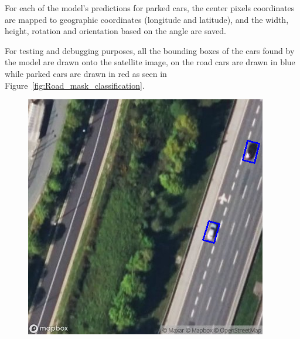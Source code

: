 For each of the model's predictions for parked cars, the center pixels coordinates are mapped to geographic coordinates (longitude and latitude), and the width, height, rotation and orientation based on the angle are saved.

For testing and debugging purposes, all the bounding boxes of the cars found by the model are drawn onto the satellite image, on the road cars are drawn in blue while parked cars are drawn in red as seen in Figure~\ref{fig:Road_mask_classification}.

\begin{figure}[htbp]
    \centering
    \begin{minipage}{0.45\textwidth}
        \centering
        \includegraphics[width=\textwidth]{images/road_mask_classification1.png}
    \end{minipage}
    \hfill
    \begin{minipage}{0.45\textwidth}
        \centering

\end{minipage}
\end{figure}
